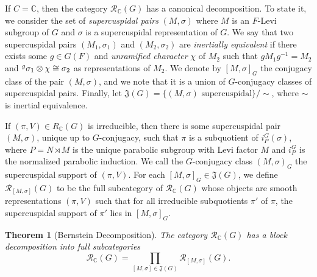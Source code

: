 \documentclass{article}
\newcommand{\cR}{\mathcal{R}}
\newcommand{\CC}{\mathbb{C}}
\theoremstyle{plain}
\newtheorem{theorem}{Theorem}[section]
\theoremstyle{definition}
\begin{document}
    If $C=\CC$, then the category $\cR_\CC(G)$ has a canonical decomposition. To state it, we consider the set of \textit{supercuspidal pairs} $(M,\sigma)$ where $M$ is an $F$-Levi subgroup of $G$ and $\sigma$ is a supercuspidal representation of $G$. 
    We say that two supercuspidal pairs $(M_1,\sigma_1)$ and $(M_2,\sigma_2)$ are \textit{inertially equivalent} if there exists some $g\in G(F)$ and \textit{unramified character} $\chi$ of $M_2$ such that $gM_1g^{-1}=M_2$ and $\prescript{g}{}{\sigma_1}\otimes\chi\cong \sigma_2$ as representations of $M_2$. We denote by $[M,\sigma]_G$ the conjugacy class of the pair $(M,\sigma)$, and we note that it is a union of $G$-conjugacy classes of supercuspidal pairs. Finally, let $\mathfrak{J}(G)=\{(M,\sigma)\text{ supercuspidal}\}/\sim$, where $\sim$ is inertial equivalence.

    If $(\pi,V)\in R_\CC(G)$ is irreducible, then there is some supercuspidal pair $(M,\sigma)$, unique up to $G$-conjugacy, such that $\pi$ is a subquotient of $i_P^G(\sigma)$, where $P=N\rtimes M$ is the unique parabolic subgroup with Levi factor $M$ and $i_P^G$ is the normalized parabolic induction. We call the $G$-conjugacy class $(M,\sigma)_G$ the supercuspidal support of $(\pi,V)$. For each $[M,\sigma]_G\in\mathfrak{J}(G)$, we define $\cR_{[M,\sigma]}(G)$ to be the full subcategory of $\cR_\CC(G)$ whose objects are smooth representations $(\pi,V)$ such that for all irreducible subquotients $\pi'$ of $\pi$, the supercuspidal support of $\pi'$ lies in $[M,\sigma]_G$.

    \begin{theorem}[Bernstein Decomposition]
        The category $\cR_\CC(G)$ has a block decomposition into full subcategories
        $$\cR_\CC(G)=\prod_{[M,\sigma]\in\mathfrak{J}(G)}\cR_{[M,\sigma]}(G).$$
    \end{theorem}
    
\end{document}
